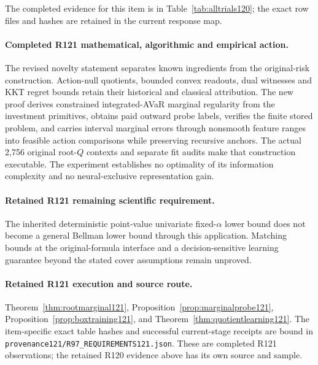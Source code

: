 The completed evidence for this item is in Table~\ref{tab:alltrials120}; the exact row files and hashes are retained in the current response map.

\paragraph{Completed R121 mathematical, algorithmic and empirical action.}
The revised novelty statement separates known ingredients from the original-risk construction. Action-null quotients, bounded convex readouts, dual witnesses and KKT regret bounds retain their historical and classical attribution. The new proof derives constrained integrated-AVaR marginal regularity from the investment primitives, obtains paid outward probe labels, verifies the finite stored problem, and carries interval marginal errors through nonsmooth feature ranges into feasible action comparisons while preserving recursive anchors. The actual 2,756 original root-$Q$ contexts and separate fit audits make that construction executable. The experiment establishes no optimality of its information complexity and no neural-exclusive representation gain.

\paragraph{Retained R121 remaining scientific requirement.}
The inherited deterministic point-value univariate fixed-$\alpha$ lower bound does not become a general Bellman lower bound through this application. Matching bounds at the original-formula interface and a decision-sensitive learning guarantee beyond the stated cover assumptions remain unproved.

\paragraph{Retained R121 execution and source route.}
Theorem~\ref{thm:rootmarginal121}, Proposition~\ref{prop:marginalprobe121}, Proposition~\ref{prop:boxtraining121}, and Theorem~\ref{thm:quotientlearning121}.
The item-specific exact table hashes and successful current-stage receipts are bound in \nolinkurl{provenance121/R97_REQUIREMENTS121.json}. These are completed R121 observations; the retained R120 evidence above has its own source and sample.

